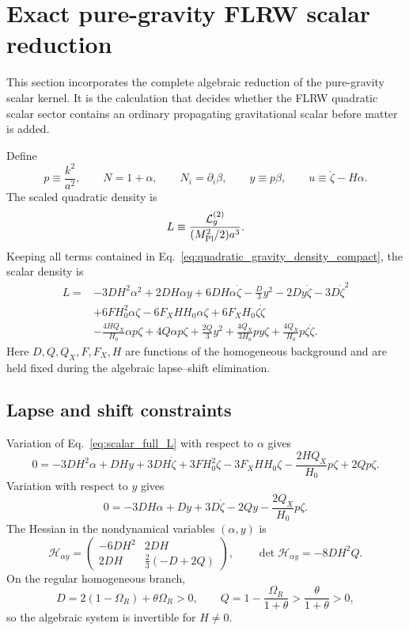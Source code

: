 \documentclass[11pt,a4paper]{article}
\newcommand{\mpl}{M_{\rm Pl}}
\newcommand{\Boxed}[1]{\boxed{\displaystyle #1}}
\begin{document}
\section{Exact pure-gravity FLRW scalar reduction}
\label{sec:exact_scalar_reduction}

This section incorporates the complete algebraic reduction of the pure-gravity scalar
kernel. It is the calculation that decides whether the FLRW quadratic scalar sector
contains an ordinary propagating gravitational scalar before matter is added.

Define
\begin{equation}
p\equiv\frac{k^2}{a^2},\qquad
N=1+\alpha,\qquad
N_i=\partial_i\beta,\qquad
y\equiv p\beta,
\qquad
u\equiv\dot\zeta-H\alpha .
\label{eq:scalar_reduction_variables}
\end{equation}
The scaled quadratic density is
\begin{equation}
L\equiv
\frac{\mathcal L_g^{(2)}}{(\mpl^2/2)a^3}.
\end{equation}
Keeping all terms contained in Eq.~\eqref{eq:quadratic_gravity_density_compact},
the scalar density is
\begin{align}
L={}&
-3DH^2\alpha^2+2DH\alpha y+6DH\alpha\dot\zeta
-\frac{D}{3}y^2-2Dy\dot\zeta-3D\dot\zeta^2
\nonumber\\
&+6FH_0^2\alpha\zeta
-6F_XHH_0\alpha\zeta
+6F_XH_0\zeta\dot\zeta
\nonumber\\
&-\frac{4HQ_X}{H_0}\alpha p\zeta
+4Q\alpha p\zeta
+\frac{2Q}{3}y^2
+\frac{4Q_X}{3H_0}py\zeta
+\frac{4Q_X}{H_0}p\zeta\dot\zeta .
\label{eq:scalar_full_L}
\end{align}
Here \(D,Q,Q_X,F,F_X,H\) are functions of the homogeneous background and are
held fixed during the algebraic lapse--shift elimination.

\subsection{Lapse and shift constraints}

Variation of Eq.~\eqref{eq:scalar_full_L} with respect to \(\alpha\) gives
\begin{equation}
\Boxed{
0=
-3DH^2\alpha+DHy+3DH\dot\zeta
+3FH_0^2\zeta-3F_XHH_0\zeta
-\frac{2HQ_X}{H_0}p\zeta
+2Qp\zeta .
}
\label{eq:alpha_constraint_exact}
\end{equation}
Variation with respect to \(y\) gives
\begin{equation}
\Boxed{
0=
-3DH\alpha+Dy+3D\dot\zeta-2Qy-\frac{2Q_X}{H_0}p\zeta .
}
\label{eq:y_constraint_exact}
\end{equation}
The Hessian in the nondynamical variables \((\alpha,y)\) is
\begin{equation}
\mathcal H_{\alpha y}=
\begin{pmatrix}
-6DH^2 & 2DH\\
2DH & \frac{2}{3}(-D+2Q)
\end{pmatrix},
\qquad
\Boxed{\det\mathcal H_{\alpha y}=-8DH^2Q.}
\label{eq:alpha_y_hessian}
\end{equation}
On the regular homogeneous branch,
\[
D=2(1-\Omega_R)+\theta\Omega_R>0,\qquad
Q=1-\frac{\Omega_R}{1+\theta}>\frac{\theta}{1+\theta}>0,
\]
so the algebraic system is invertible for \(H\neq0\).
\end{document}
